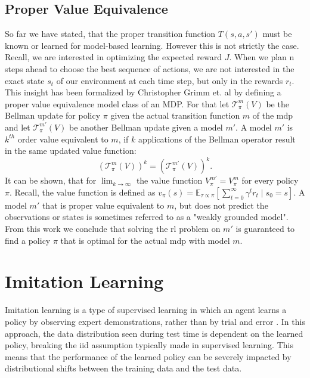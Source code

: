 \subsection{Proper Value Equivalence}
\label{sec:prop_val_eq}
So far we have stated, that the proper transition function $T(s,a,s')$ must be known or learned for model-based learning. However this is not strictly the case. Recall, we are 
interested in optimizing the expected reward $J$. When we plan n steps ahead to choose the best sequence of actions, we are not interested in the exact state $s_t$ 
of our environment at each time step, but only in the rewards $r_t$. \\
This insight has been formalized by Christopher Grimm et. al \cite{grimm2021proper} by defining a proper value equivalence model class of an MDP. For that 
let $\mathcal{T}^m_{\pi}(V)$ be the Bellman update for policy $\pi$ given the actual transition function $m$ of the \ac{mdp} and let 
$\mathcal{T}^{m'}_{\pi}(V)$ be another Bellman update given a model $m'$. A model $m'$ is $k^{th}$ order value equivalent to $m$, 
if $k$ applications of the Bellman operator result in the same updated value function: 
\begin{equation}
    \label{eq_kthVE}
    \left(\mathcal{T}^{m}_{\pi}(V)\right)^k = \left(\mathcal{T}^{m'}_{\pi}(V)\right)^k.
\end{equation}
It can be shown, that for $\lim_{k \rightarrow \infty}$ the value function $V_{\pi}^{m'} = V_{\pi}^m$ for every policy $\pi$. Recall, the value function is 
defined as $v_{\pi}(s) = \mathbb{E}_{\tau \propto \pi}\left[\sum_{t=0}^{\infty} \gamma^t r_t \mid s_0 = s\right]$. A model $m'$ that is proper value 
equivalent to $m$, but does not predict the observations or states is sometimes referred to as a "weakly grounded model".\\ 
From this work we conclude that solving the 
\ac{rl} problem on $m'$ is guaranteed to find a policy $\pi$ that is optimal for the actual \ac{mdp} with model $m$. 

\section{Imitation Learning}
Imitation learning is a type of supervised learning in which an agent learns a policy by observing expert demonstrations, 
rather than by trial and error \cite{IL}. In this approach, the data distribution seen during test time is dependent on the learned policy, 
breaking the \ac{iid} assumption typically made in supervised learning. This means that the performance of the 
learned policy can be severely impacted by distributional shifts between the training data and the test data. \\ \\

